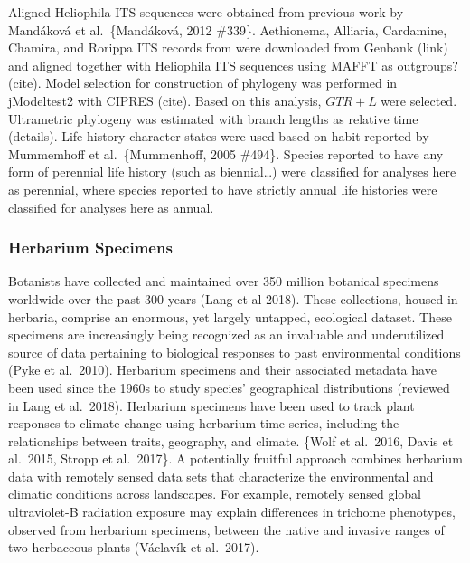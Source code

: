 \documentclass[man,floatsintext]{apa6}
\theoremstyle{definition}
\theoremstyle{definition}
\theoremstyle{definition}
\theoremstyle{remark}
\begin{document}
Aligned Heliophila ITS sequences were obtained from previous work by
Mandáková et al.~\{Mandáková, 2012 \#339\}. Aethionema, Alliaria,
Cardamine, Chamira, and Rorippa ITS records from were downloaded from
Genbank (link) and aligned together with Heliophila ITS sequences using
MAFFT as outgroups? (cite). Model selection for construction of
phylogeny was performed in jModeltest2 with CIPRES (cite). Based on this
analysis, \(GTR + L\) were selected. Ultrametric phylogeny was estimated
with branch lengths as relative time (details). Life history character
states were used based on habit reported by Mummemhoff et
al.~\{Mummenhoff, 2005 \#494\}. Species reported to have any form of
perennial life history (such as biennial\ldots{}) were classified for
analyses here as perennial, where species reported to have strictly
annual life histories were classified for analyses here as annual.

\hypertarget{herbarium-specimens}{%
\subsubsection{Herbarium Specimens}\label{herbarium-specimens}}

Botanists have collected and maintained over 350 million botanical
specimens worldwide over the past 300 years (Lang et al 2018). These
collections, housed in herbaria, comprise an enormous, yet largely
untapped, ecological dataset. These specimens are increasingly being
recognized as an invaluable and underutilized source of data pertaining
to biological responses to past environmental conditions (Pyke et
al.~2010). Herbarium specimens and their associated metadata have been
used since the 1960s to study species' geographical distributions
(reviewed in Lang et al.~2018). Herbarium specimens have been used to
track plant responses to climate change using herbarium time-series,
including the relationships between traits, geography, and climate.
\{Wolf et al.~2016, Davis et al.~2015, Stropp et al.~2017\}. A
potentially fruitful approach combines herbarium data with remotely
sensed data sets that characterize the environmental and climatic
conditions across landscapes. For example, remotely sensed global
ultraviolet-B radiation exposure may explain differences in trichome
phenotypes, observed from herbarium specimens, between the native and
invasive ranges of two herbaceous plants (Václavík et al.~2017).
\end{document}
